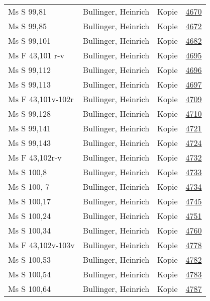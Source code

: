 \documentclass[10pt,a4paper,landscape]{report}
\begin{document}
\begin{longtable}{p{16cm}p{4cm}lr}
Ms S 99,81	&	Bullinger, Heinrich	&	Kopie	&	\href{http://130.60.24.72/assignment/4670}{4670}\\
Ms S 99,85	&	Bullinger, Heinrich	&	Kopie	&	\href{http://130.60.24.72/assignment/4672}{4672}\\
Ms S 99,101	&	Bullinger, Heinrich	&	Kopie	&	\href{http://130.60.24.72/assignment/4682}{4682}\\
Ms F 43,101 r-v	&	Bullinger, Heinrich	&	Kopie	&	\href{http://130.60.24.72/assignment/4695}{4695}\\
Ms S 99,112	&	Bullinger, Heinrich	&	Kopie	&	\href{http://130.60.24.72/assignment/4696}{4696}\\
Ms S 99,113	&	Bullinger, Heinrich	&	Kopie	&	\href{http://130.60.24.72/assignment/4697}{4697}\\
Ms F 43,101v-102r	&	Bullinger, Heinrich	&	Kopie	&	\href{http://130.60.24.72/assignment/4709}{4709}\\
Ms S 99,128	&	Bullinger, Heinrich	&	Kopie	&	\href{http://130.60.24.72/assignment/4710}{4710}\\
Ms S 99,141	&	Bullinger, Heinrich	&	Kopie	&	\href{http://130.60.24.72/assignment/4721}{4721}\\
Ms S 99,143	&	Bullinger, Heinrich	&	Kopie	&	\href{http://130.60.24.72/assignment/4724}{4724}\\
Ms F 43,102r-v	&	Bullinger, Heinrich	&	Kopie	&	\href{http://130.60.24.72/assignment/4732}{4732}\\
Ms S 100,8	&	Bullinger, Heinrich	&	Kopie	&	\href{http://130.60.24.72/assignment/4733}{4733}\\
Ms S 100, 7	&	Bullinger, Heinrich	&	Kopie	&	\href{http://130.60.24.72/assignment/4734}{4734}\\
Ms S 100,17	&	Bullinger, Heinrich	&	Kopie	&	\href{http://130.60.24.72/assignment/4745}{4745}\\
Ms S 100,24	&	Bullinger, Heinrich	&	Kopie	&	\href{http://130.60.24.72/assignment/4751}{4751}\\
Ms S 100,34	&	Bullinger, Heinrich	&	Kopie	&	\href{http://130.60.24.72/assignment/4760}{4760}\\
Ms F 43,102v-103v	&	Bullinger, Heinrich	&	Kopie	&	\href{http://130.60.24.72/assignment/4778}{4778}\\
Ms S 100,53	&	Bullinger, Heinrich	&	Kopie	&	\href{http://130.60.24.72/assignment/4782}{4782}\\
Ms S 100,54	&	Bullinger, Heinrich	&	Kopie	&	\href{http://130.60.24.72/assignment/4783}{4783}\\
Ms S 100,64	&	Bullinger, Heinrich	&	Kopie	&	\href{http://130.60.24.72/assignment/4787}{4787}\\

\end{longtable}
\end{document}
